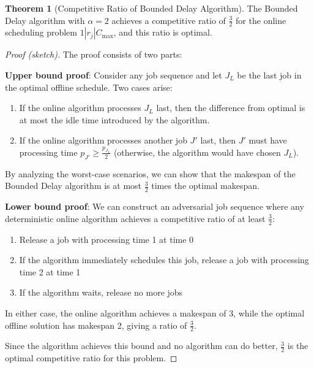 \documentclass{article}
\theoremstyle{definition}
\newtheorem{theorem}{Theorem}
\begin{document}
\begin{theorem}[Competitive Ratio of Bounded Delay Algorithm]
The Bounded Delay algorithm with $\alpha = 2$ achieves a competitive ratio of $\frac{3}{2}$ for the online scheduling problem $1|r_j|C_{\max}$, and this ratio is optimal.

\begin{proof}[Proof (sketch)]
The proof consists of two parts:

\textbf{Upper bound proof}:
Consider any job sequence and let $J_L$ be the last job in the optimal offline schedule. Two cases arise:
\begin{enumerate}
    \item If the online algorithm processes $J_L$ last, then the difference from optimal is at most the idle time introduced by the algorithm.
    \item If the online algorithm processes another job $J'$ last, then $J'$ must have processing time $p_{J'} \geq \frac{p_{J_L}}{2}$ (otherwise, the algorithm would have chosen $J_L$).
\end{enumerate}

By analyzing the worst-case scenarios, we can show that the makespan of the Bounded Delay algorithm is at most $\frac{3}{2}$ times the optimal makespan.

\textbf{Lower bound proof}:
We can construct an adversarial job sequence where any deterministic online algorithm achieves a competitive ratio of at least $\frac{3}{2}$:
\begin{enumerate}
    \item Release a job with processing time 1 at time 0
    \item If the algorithm immediately schedules this job, release a job with processing time 2 at time 1
    \item If the algorithm waits, release no more jobs
\end{enumerate}

In either case, the online algorithm achieves a makespan of 3, while the optimal offline solution has makespan 2, giving a ratio of $\frac{3}{2}$.

Since the algorithm achieves this bound and no algorithm can do better, $\frac{3}{2}$ is the optimal competitive ratio for this problem.
\end{proof}
\end{theorem}
\end{document}
